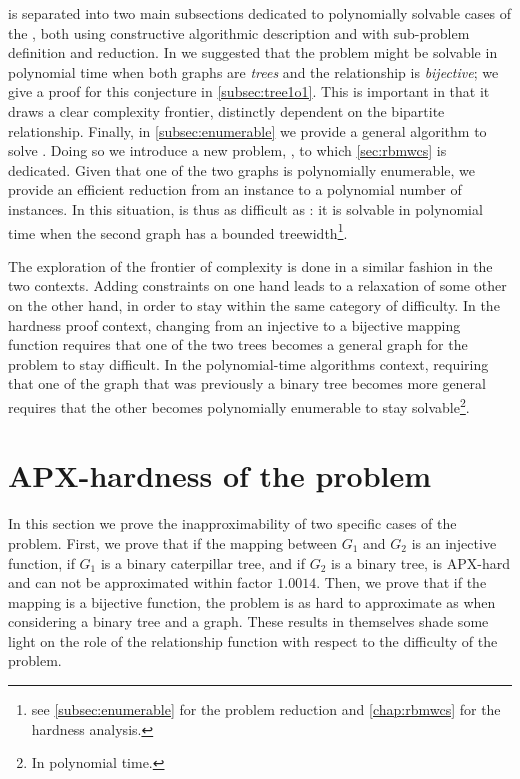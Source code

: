 	 is separated into two main subsections dedicated to polynomially solvable cases of the \mwccs{}, both using constructive algorithmic description and with sub-problem definition and reduction.
	In \cite{hume2015approximation} we suggested that the problem might be solvable in polynomial time when both graphs are \emph{trees} and the relationship is \emph{bijective}; we give a proof for this conjecture in \cref{subsec:tree1o1}.
	This is important in that it draws a clear complexity frontier, distinctly dependent on the bipartite relationship.
	Finally, in \cref{subsec:enumerable} we provide a general algorithm to solve \mwccs{}.
	Doing so we introduce a new problem, \rbmwcs{}, to which \cref{sec:rbmwcs} is dedicated.
	Given that one of the two graphs is polynomially enumerable, we provide an efficient reduction from an \mwccs{} instance to a polynomial number of \rbmwcs{} instances.
	In this situation, \mwccs{} is thus as difficult as \rbmwcs{}: it is solvable in polynomial time when the second graph has a bounded treewidth\footnote{see \cref{subsec:enumerable} for the problem reduction and \cref{chap:rbmwcs} for the \rbmwcs{} hardness analysis.}.

	The exploration of the frontier of complexity is done in a similar fashion in the two contexts.
	Adding constraints on one hand leads to a relaxation of some other on the other hand, in order to stay within the same category of difficulty.
	In the hardness proof context, changing from an injective to a bijective mapping function requires that one of the two trees becomes a general graph for the problem to stay difficult.
	In the polynomial-time algorithms context, requiring that one of the graph that was previously a binary tree becomes more general%
	requires that the other becomes polynomially enumerable to stay solvable\footnote{In polynomial time.}.
	
	\section{APX-hardness of the \mwccs{} problem}
	\label{sec:apx}

		In this section we prove the inapproximability of two specific cases of the \mwccs{} problem.
		First, we prove that if the mapping between $G_1$ and $G_2$ is an injective function, if $G_1$ is a binary caterpillar tree, and if $G_2$ is a binary tree, \mwccs{} is APX-hard and can not be approximated within factor $1.0014$.
		Then, we prove that if the mapping is a bijective function, the problem is as hard to approximate as when considering a binary tree and a graph.
		These results in themselves shade some light on the role of the relationship function with respect to the difficulty of the problem.

